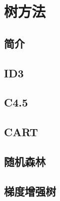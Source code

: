 \chapter{树方法} %
\label{cha:树方法}

\section{简介} %
\label{sec:简介}


\section{ID3} %
\label{sec:id3}


\section{C4.5} %
\label{sec:c4_5}


\section{CART} %
\label{sec:cart}


\section{随机森林} %
\label{sec:随机森林}


\section{梯度增强树} %
\label{sec:梯度增强树}


